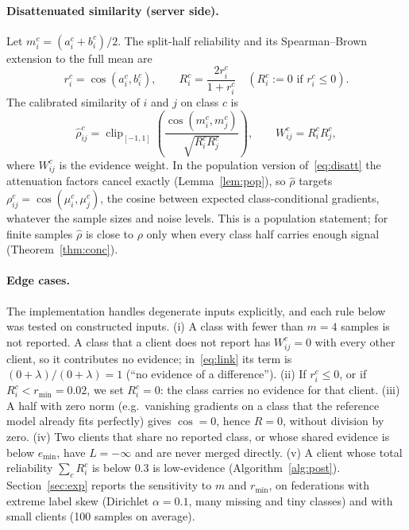 \documentclass[pdflatex,sn-apa]{sn-jnl}
\theoremstyle{thmstyleone}
\theoremstyle{thmstylethree}
\newcommand{\rhohat}{\hat\rho}
\begin{document}
\paragraph{Disattenuated similarity (server side).}
Let $m_i^c=(a_i^c+b_i^c)/2$. The split-half reliability and its Spearman--Brown extension to the full mean are
\begin{equation}\label{eq:rel}
r_i^c=\cos(a_i^c,b_i^c),\qquad R_i^c=\frac{2r_i^c}{1+r_i^c}\quad(R_i^c:=0 \text{ if } r_i^c\le 0).
\end{equation}
The calibrated similarity of $i$ and $j$ on class $c$ is
\begin{equation}\label{eq:disatt}
\rhohat_{ij}^c=\operatorname{clip}_{[-1,1]}\!\left(\frac{\cos(m_i^c,m_j^c)}{\sqrt{R_i^cR_j^c}}\right),\qquad W_{ij}^c=R_i^cR_j^c,
\end{equation}
where $W_{ij}^c$ is the evidence weight. In the population version of~\eqref{eq:disatt} the attenuation factors cancel exactly (Lemma~\ref{lem:pop}), so $\rhohat$ targets $\rho_{ij}^c=\cos(\mu_i^c,\mu_j^c)$, the cosine between expected class-conditional gradients, whatever the sample sizes and noise levels. This is a population statement; for finite samples $\rhohat$ is close to $\rho$ only when every class half carries enough signal (Theorem~\ref{thm:conc}).

\paragraph{Edge cases.} The implementation handles degenerate inputs explicitly, and each rule below was tested on constructed inputs. (i) A class with fewer than $m=4$ samples is not reported. A class that a client does not report has $W^c_{ij}=0$ with every other client, so it contributes no evidence; in~\eqref{eq:link} its term is $(0+\lambda)/(0+\lambda)=1$ (``no evidence of a difference''). (ii) If $r_i^c\le0$, or if $R_i^c<r_{\min}=0.02$, we set $R_i^c=0$: the class carries no evidence for that client. (iii) A half with zero norm (e.g.\ vanishing gradients on a class that the reference model already fits perfectly) gives $\cos=0$, hence $R=0$, without division by zero. (iv) Two clients that share no reported class, or whose shared evidence is below $e_{\min}$, have $L=-\infty$ and are never merged directly. (v) A client whose total reliability $\sum_cR_i^c$ is below $0.3$ is low-evidence (Algorithm~\ref{alg:post}). Section~\ref{sec:exp} reports the sensitivity to $m$ and $r_{\min}$, on federations with extreme label skew (Dirichlet $\alpha=0.1$, many missing and tiny classes) and with small clients (100 samples on average).
\end{document}
